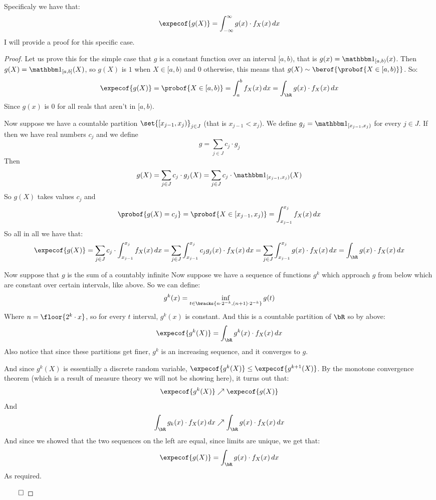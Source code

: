 Specificaly we have that:
\[ \expecof{g(X)} = \int_{-\infty}^\infty g(x)\cdot f_X(x)\,dx \]
I will provide a proof for this specific case.

\begin{proof}

	Let us prove this for the simple case that $g$ is a constant function over an interval $[a,b)$, that is $g(x)=\bone_{[a,b)}(x)$.
	Then $g(X)=\bone_{[a,b]}(X)$, so $g(X)$ is $1$ when $X\in[a,b)$ and $0$ otherwise, this means that $g(X)\sim\berof{\probof{X\in[a,b)}}$.
	So:
	\[ \expecof{g(X)} = \probof{X\in[a,b)} = \int_a^b f_X(x)\,dx = \int_\bR g(x)\cdot f_X(x)\,dx \]
	Since $g(x)$ is $0$ for all reals that aren't in $[a,b)$.

	Now suppose we have a countable partition $\set{[x_{j-1},x_j)}_{j\in J}$ (that is $x_{j-1}<x_j$).
	We define $g_j=\bone_{[x_{j-1},x_j)}$ for every $j\in J$.
	If then we have real numbers $c_j$ and we define
	\[ g = \sum_{j\in J} c_j\cdot g_j \]
	Then 
	\[ g(X) = \sum_{j\in J} c_j\cdot g_j(X) = \sum_{j\in J} c_j\cdot\bone_{[x_{j-1},x_j)}(X) \]
	So $g(X)$ takes values $c_j$ and 
	\[ \probof{g(X)=c_j} = \probof{X\in[x_{j-1},x_j)} = \int_{x_{j-1}}^{x_j}f_X(x)\,dx \]
	So all in all we have that:
	\[ \expecof{g(X)} = \sum_{j\in J} c_j\cdot\int_{x_{j-1}}^{x_j}f_X(x)\,dx = \sum_{j\in J}\int_{x_{j-1}}^{x_j} c_jg_j(x)\cdot f_X(x)\,dx =
	\sum_{j\in J} \int_{x_{j-1}}^{x_j}g(x)\cdot f_X(x)\,dx = \int_\bR g(x)\cdot f_X(x)\,dx \]

	Now suppose that $g$ is the sum of a countably infinite 
	Now suppose we have a sequence of functions $g^k$ which approach $g$ from below which are constant over certain intervals, like above.
	So we can define:
	\[ g^k(x) = \inf_{t\in\bracks{n\cdot 2^{-k}, (n+1)\cdot 2^{-k}}} g(t) \]
	Where $n=\floor{2^k\cdot x}$, so for every $t$ interval, $g^k(x)$ is constant.
	And this is a countable partition of $\bR$ so by above:
	\[ \expecof{g^k(X)} = \int_\bR g^k(x)\cdot f_X(x)\,dx \]
	Also notice that since these partitions get finer, $g^k$ is an increasing sequence, and it converges to $g$.

	And since $g^k(X)$ is essentially a discrete random variable, $\expecof{g^k(X)}\leq\expecof{g^{k+1}(X)}$.
	By the monotone convergence theorem (which is a result of measure theory we will not be showing here), it turns out that:
	\[ \expecof{g^k(X)} \nearrow \expecof{g(X)} \]
	And
	\[ \int_\bR g_k(x)\cdot f_X(x)\,dx \nearrow \int_\bR g(x)\cdot f_X(x)\,dx \]
	And since we showed that the two sequences on the left are equal, since limits are unique, we get that:
	\[ \expecof{g(X)} = \int_\bR g(x)\cdot f_X(x)\,dx \]
	As required.

	\hfill$\qed$

\end{proof}

